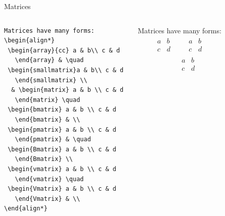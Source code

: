 \documentclass[aspectratio=1610]{beamer}
\begin{document}
\begin{frame}[fragile]{Matrices}
  \begin{columns}[T]
      \begin{lstlisting}
Matrices have many forms:
\begin{align*}
 \begin{array}{cc} a & b\\ c & d 
   \end{array} & \quad
 \begin{smallmatrix}a & b\\ c & d 
   \end{smallmatrix} \\
  & \begin{matrix} a & b \\ c & d 
   \end{matrix} \quad 
 \begin{bmatrix} a & b \\ c & d 
   \end{bmatrix} & \\
 \begin{pmatrix} a & b \\ c & d 
   \end{pmatrix} & \quad
 \begin{Bmatrix} a & b \\ c & d 
   \end{Bmatrix} \\
 \begin{vmatrix} a & b \\ c & d 
   \end{vmatrix} \quad 
 \begin{Vmatrix} a & b \\ c & d 
   \end{Vmatrix} & \\
\end{align*}
      \end{lstlisting}
Matrices have many forms:
\begin{align*}
 \begin{array}{cc} a & b\\ c & d 
   \end{array} & \quad
 \begin{smallmatrix}a & b\\ c & d 
   \end{smallmatrix} \\
  & \begin{matrix} a & b \\ c & d 

\end{matrix}
\end{align*}
\end{columns}
\end{frame}
\end{document}
